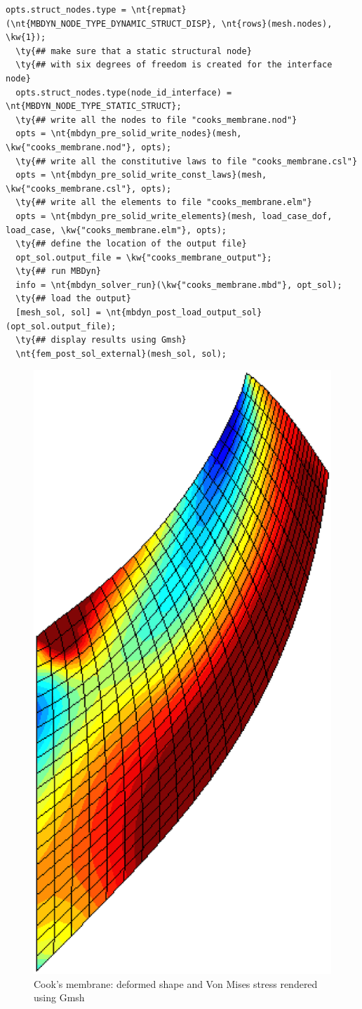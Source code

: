 \begin{Verbatim}[commandchars=\\\{\}]
  opts.struct_nodes.type = \nt{repmat}(\nt{MBDYN_NODE_TYPE_DYNAMIC_STRUCT_DISP}, \nt{rows}(mesh.nodes), \kw{1});
  \ty{## make sure that a static structural node}
  \ty{## with six degrees of freedom is created for the interface node}
  opts.struct_nodes.type(node_id_interface) = \nt{MBDYN_NODE_TYPE_STATIC_STRUCT};
  \ty{## write all the nodes to file "cooks_membrane.nod"}
  opts = \nt{mbdyn_pre_solid_write_nodes}(mesh, \kw{"cooks_membrane.nod"}, opts);
  \ty{## write all the constitutive laws to file "cooks_membrane.csl"}
  opts = \nt{mbdyn_pre_solid_write_const_laws}(mesh, \kw{"cooks_membrane.csl"}, opts);
  \ty{## write all the elements to file "cooks_membrane.elm"}
  opts = \nt{mbdyn_pre_solid_write_elements}(mesh, load_case_dof, load_case, \kw{"cooks_membrane.elm"}, opts);
  \ty{## define the location of the output file}
  opt_sol.output_file = \kw{"cooks_membrane_output"};
  \ty{## run MBDyn}
  info = \nt{mbdyn_solver_run}(\kw{"cooks_membrane.mbd"}, opt_sol);
  \ty{## load the output}
  [mesh_sol, sol] = \nt{mbdyn_post_load_output_sol}(opt_sol.output_file);
  \ty{## display results using Gmsh}
  \nt{fem_post_sol_external}(mesh_sol, sol);
\end{Verbatim}

\begin{figure}[htb]
\centering
\includegraphics[width=.25\textwidth]{elemsolid}
\caption{Cook's membrane: deformed shape and Von Mises stress rendered using Gmsh}
\label{fig:EL:SOLID:COOKS-MEMBRANE}
\end{figure}
\clearpage
